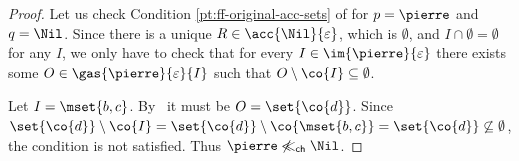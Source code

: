 \begin{counterexample}
\begin{proof}
Let us check Condition \ref{pt:ff-original-acc-sets} of
   for $p = \pierre$ and $q = \Nil$. Since there is
  a unique $\readyset\in \acc{\Nil}{\varepsilon}$, which is
  $\emptyset$, and $I \cap \emptyset = \emptyset$ for any $I$, we only
  have to check that for every $I \in \im{\pierre}{\varepsilon}$ there
  exists some $O \in \gas{\pierre}{\varepsilon}{I}$ such that
  $O \setminus \co{I} \subseteq \emptyset$.

Let $I = \mset{ b, c }$.
By~ it must be $O =\set{ \co{d} }$. Since
  $ \set{ \co{d} } \setminus \co{I} = \set{ \co{d} } \setminus \co{
    \mset{ b, c } } = \set{ \co{d} } \not\subseteq \emptyset$, the
  condition is not satisfied. Thus $\pierre \not\llch \Nil$.
\end{proof}
\end{counterexample}



  

